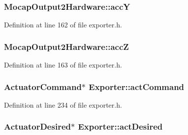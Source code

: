 \hypertarget{group___mo_cap_plugin_gad47738d7c1cd424f7d9508b4d44a4043}{
\subsubsection[{acc\-Y}]{ Mocap\-Output2\-Hardware\-::acc\-Y}}\label{group___mo_cap_plugin_gad47738d7c1cd424f7d9508b4d44a4043}


Definition at line 162 of file exporter.\-h.

\hypertarget{group___mo_cap_plugin_gae919304b20a26d362f67b32533118ce7}{
\subsubsection[{acc\-Z}]{ Mocap\-Output2\-Hardware\-::acc\-Z}}\label{group___mo_cap_plugin_gae919304b20a26d362f67b32533118ce7}


Definition at line 163 of file exporter.\-h.

\hypertarget{group___mo_cap_plugin_gaaa8cd64f3935d77113b41cf84f398e78}{
\subsubsection[{act\-Command}]{\setlength{\rightskip}{0pt plus 5cm}Actuator\-Command$\ast$ Exporter\-::act\-Command\hspace{0.3cm}{\ttfamily [protected]}}}\label{group___mo_cap_plugin_gaaa8cd64f3935d77113b41cf84f398e78}


Definition at line 234 of file exporter.\-h.

\hypertarget{group___mo_cap_plugin_ga480be6f8874e252461095878c7b41d08}{
\subsubsection[{act\-Desired}]{\setlength{\rightskip}{0pt plus 5cm}Actuator\-Desired$\ast$ Exporter\-::act\-Desired\hspace{0.3cm}{\ttfamily [protected]}}}\label{group___mo_cap_plugin_ga480be6f8874e252461095878c7b41d08}


